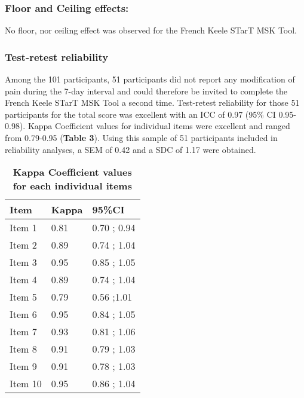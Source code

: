 \subsubsection{Floor and Ceiling effects: }
No floor, nor ceiling effect was observed for the French Keele STarT MSK Tool. 

\subsubsection{Test-retest reliability}
Among the 101 participants, 51 participants did not report any modification of pain during the 7-day interval and could therefore be invited to complete the French Keele STarT MSK Tool a second time. Test-retest reliability for those 51 participants for the total score was excellent with an ICC of 0.97 (95\% CI 0.95-0.98). Kappa Coefficient values for individual items were excellent and ranged from 0.79-0.95 (\textbf{Table 3}). Using this sample of 51 participants included in reliability analyses, a SEM of 0.42 and a SDC of 1.17 were obtained.  

\begin{table}[ht]
\caption{\bf Kappa Coefficient values for each individual items}
\begin{tabular}{p{2.5cm} p{2.5cm} p{2.5cm}}
\hline
\textbf{Item}&	\textbf{Kappa}&	\textbf{95\%CI} \\
\hline
Item 1 & 0.81 &	0.70 ; 0.94 \\
Item 2 & 0.89 &	0.74 ; 1.04 \\
Item 3 & 0.95 &	0.85 ; 1.05 \\
Item 4 & 0.89 &	0.74 ; 1.04 \\
Item 5 & 0.79 &	0.56 ;1.01 \\
Item 6 & 0.95 &	0.84 ; 1.05 \\
Item 7 & 0.93 &	0.81 ; 1.06 \\
Item 8 & 0.91 &	0.79 ; 1.03 \\
Item 9 & 0.91 & 0.78 ; 1.03 \\
Item 10 & 0.95 & 0.86 ; 1.04
\\
\hline
\end{tabular}
\end{table}

\medbreak
